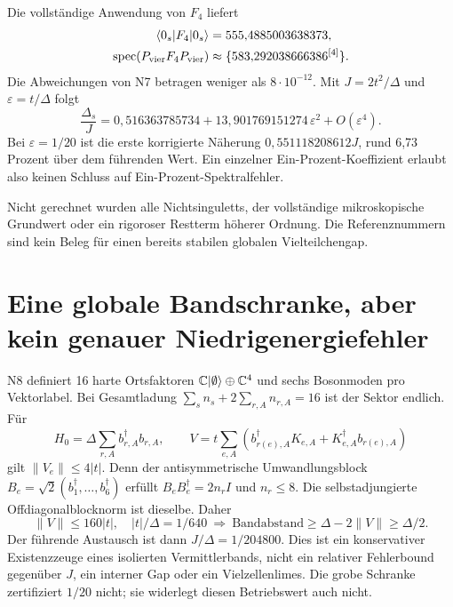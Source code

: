 Die vollständige Anwendung von $F_4$ liefert
\begin{align}
\langle0_s|F_4|0_s\rangle&=555{,}4885003638373,\\
\operatorname{spec}(P_{\mathrm{vier}}F_4P_{\mathrm{vier}})
&\approx\{583{,}292038666386^{[4]}\}.
\end{align}
Die Abweichungen von N7 betragen weniger als $8\cdot10^{-12}$. Mit $J=2t^2/\Delta$ und $\varepsilon=t/\Delta$ folgt
\begin{equation}
\frac{\Delta_s}{J}
=0{,}516363785734
+13{,}901769151274\,\varepsilon^2+O(\varepsilon^4).
\end{equation}
Bei $\varepsilon=1/20$ ist die erste korrigierte Näherung $0{,}551118208612J$, rund 6,73 Prozent über dem führenden Wert. Ein einzelner Ein-Prozent-Koeffizient erlaubt also keinen Schluss auf Ein-Prozent-Spektralfehler.

Nicht gerechnet wurden alle Nichtsinguletts, der vollständige mikroskopische Grundwert oder ein rigoroser Restterm höherer Ordnung. Die Referenznummern sind kein Beleg für einen bereits stabilen globalen Vielteilchengap.

\section{Eine globale Bandschranke, aber kein genauer Niedrigenergiefehler}
N8 definiert 16 harte Ortsfaktoren $\mathbb C\lvert\emptyset\rangle\oplus\mathbb C^4$ und sechs Bosonmoden pro Vektorlabel. Bei Gesamtladung $\sum_sn_s+2\sum_{r,A}n_{r,A}=16$ ist der Sektor endlich. Für
\begin{equation}
H_0=\Delta\sum_{r,A}b^\dagger_{r,A}b_{r,A},\qquad
V=t\sum_{e,A}(b^\dagger_{r(e),A}K_{e,A}+K^\dagger_{e,A}b_{r(e),A})
\end{equation}
gilt $\|V_e\|\le4|t|$. Denn der antisymmetrische Umwandlungsblock $B_e=\sqrt2(b_1^\dagger,\ldots,b_6^\dagger)$ erfüllt $B_eB_e^\dagger=2n_rI$ und $n_r\le8$. Die selbstadjungierte Offdiagonalblocknorm ist dieselbe. Daher
\begin{equation}
\|V\|\le160|t|,\quad |t|/\Delta=1/640
\ \Longrightarrow\ 
\text{Bandabstand}\ge\Delta-2\|V\|\ge\Delta/2.
\end{equation}
Der führende Austausch ist dann $J/\Delta=1/204800$. Dies ist ein konservativer Existenzzeuge eines isolierten Vermittlerbands, nicht ein relativer Fehlerbound gegenüber $J$, ein interner Gap oder ein Vielzellenlimes. Die grobe Schranke zertifiziert $1/20$ nicht; sie widerlegt diesen Betriebswert auch nicht.


